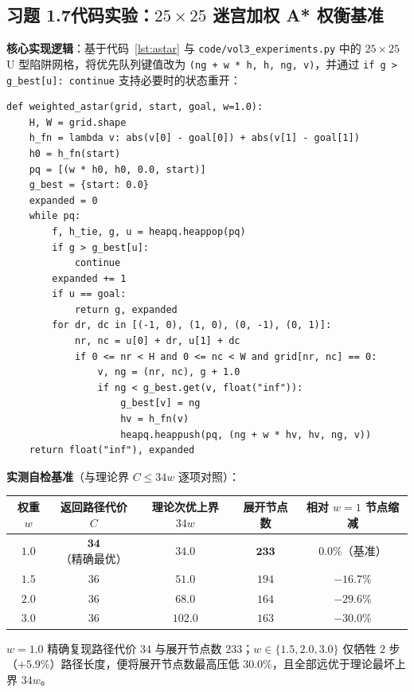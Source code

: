\subsection*{习题 1.7\quad 代码实验：$25\times 25$ 迷宫加权 A* 权衡基准}
\textbf{核心实现逻辑}：基于代码~\ref{lst:astar} 与 \texttt{code/\allowbreak vol3\_experiments.py} 中的 $25\times 25$ U 型陷阱网格，将优先队列键值改为 \texttt{(ng + w * h, h, ng, v)}，并通过 \texttt{if g > g\_best[u]: continue} 支持必要时的状态重开：
\begin{lstlisting}
def weighted_astar(grid, start, goal, w=1.0):
    H, W = grid.shape
    h_fn = lambda v: abs(v[0] - goal[0]) + abs(v[1] - goal[1])
    h0 = h_fn(start)
    pq = [(w * h0, h0, 0.0, start)]
    g_best = {start: 0.0}
    expanded = 0
    while pq:
        f, h_tie, g, u = heapq.heappop(pq)
        if g > g_best[u]:
            continue
        expanded += 1
        if u == goal:
            return g, expanded
        for dr, dc in [(-1, 0), (1, 0), (0, -1), (0, 1)]:
            nr, nc = u[0] + dr, u[1] + dc
            if 0 <= nr < H and 0 <= nc < W and grid[nr, nc] == 0:
                v, ng = (nr, nc), g + 1.0
                if ng < g_best.get(v, float("inf")):
                    g_best[v] = ng
                    hv = h_fn(v)
                    heapq.heappush(pq, (ng + w * hv, hv, ng, v))
    return float("inf"), expanded
\end{lstlisting}
\textbf{实测自检基准}（与理论界 $C \le 34 w$ 逐项对照）：
\begin{center}
\small
\begin{tabular}{@{}ccccc@{}}
\toprule
\textbf{权重 $w$} & \textbf{返回路径代价 $C$} & \textbf{理论次优上界 $34 w$} & \textbf{展开节点数} & \textbf{相对 $w=1$ 节点缩减} \\
\midrule
$1.0$ & $\mathbf{34}$（精确最优） & $34.0$ & $\mathbf{233}$ & $0.0\%$（基准） \\
$1.5$ & $36$ & $51.0$ & $194$ & $-16.7\%$ \\
$2.0$ & $36$ & $68.0$ & $164$ & $-29.6\%$ \\
$3.0$ & $36$ & $102.0$ & $163$ & $-30.0\%$ \\
\bottomrule
\end{tabular}
\end{center}
$w=1.0$ 精确复现路径代价 $34$ 与展开节点数 $233$；$w \in \{1.5, 2.0, 3.0\}$ 仅牺牲 $2$ 步（$+5.9\%$）路径长度，便将展开节点数最高压低 $30.0\%$，且全部远优于理论最坏上界 $34 w$。


